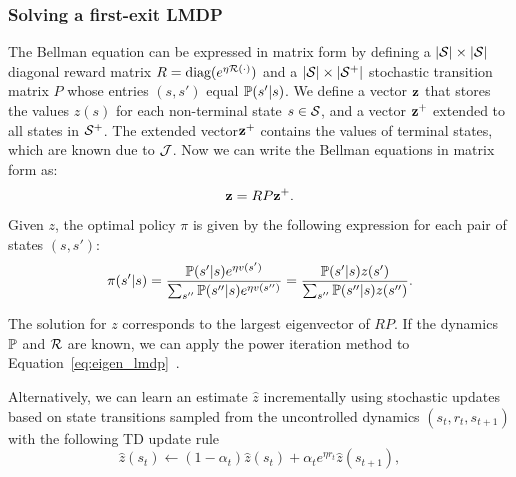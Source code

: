\subsubsection{Solving a first-exit LMDP}
The Bellman equation can be expressed in matrix form by defining a $\lvert\mathcal{S}\rvert\times\lvert\mathcal{S}\rvert$ diagonal reward matrix $R=\text{diag}(e^{\eta\mathcal{R}(\cdot)})$ and a $\lvert\mathcal{S}\rvert\times \lvert\mathcal{S}^+\rvert$ stochastic transition matrix $P$ whose entries $(s,s')$ equal $\mathbb{P}(s'|s)$. We define a vector $\bf z$ that stores the values $z(s)$ for each non-terminal state $s\in\mathcal{S}$, and a vector $\bf z^+$ extended to all states in $\mathcal{S}^+$. The extended vector$\bf z^+$ contains the values of terminal states, which are known due to $\mathcal{J}$. Now we can write the Bellman equations in matrix form as:
\begin{equation}\label{eq:eigen_lmdp}
{\bf z} = R P {\bf z^+}.
\end{equation}
Given $z$, the optimal policy $\pi$ is given by the following expression for each pair of states $(s,s')$:
\begin{equation}
\label{eq:lmdp_optimal_policy}
\pi(s'|s) =  \frac {\mathbb{P}(s'|s) e^{\eta v(s')} } {\sum_{s''} \mathbb{P}(s''|s) e^{\eta v(s'')} } = \frac {\mathbb{P}(s'|s)z(s')} {\sum_{s''} \mathbb{P}(s''|s)z(s'')}.
\end{equation}

The solution for $z$ corresponds to the largest eigenvector of $RP$.
If the dynamics $\mathbb{P}$ and $\mathcal{R}$ are known, we can apply the power iteration method to Equation~\eqref{eq:eigen_lmdp}~\citep{Todorov2006}.

Alternatively, we can learn an estimate $\widehat{z}$ incrementally using stochastic updates based on state transitions sampled from the uncontrolled dynamics $(s_t,r_t,s_{t+1})$ with the following TD update rule
\begin{equation*}
  \widehat{z}(s_t) \leftarrow (1-\alpha_t)\widehat{z}(s_t) + \alpha_t e^{\eta r_t}\widehat{z}(s_{t+1}),
\end{equation*}

